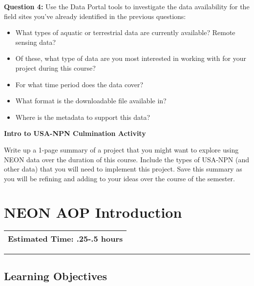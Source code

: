 \documentclass[]{book}
\providecommand{\tightlist}{%
  \setlength{\itemsep}{0pt}\setlength{\parskip}{0pt}}
\begin{document}
\leavevmode\hypertarget{ds-challenge}{}%
\textbf{Question 4:}
Use the Data Portal tools to investigate the data availability for the field
sites you've already identified in the previous questions:

\begin{itemize}
\tightlist
\item
  What types of aquatic or terrestrial data are currently available? Remote sensing data?\\
\item
  Of these, what type of data are you most interested in working with for your project during this course?\\
\item
  For what time period does the data cover?\\
\item
  What format is the downloadable file available in?\\
\item
  Where is the metadata to support this data?\\
\end{itemize}

\textbf{Intro to USA-NPN Culmination Activity}

Write up a 1-page summary of a project that you might want to explore using NEON data over the duration of this course. Include the types of USA-NPN (and other data) that you will need to implement this project. Save this summary as you will be refining and adding to your ideas over the course of the semester.

\hypertarget{neon-aop-introduction}{%
\chapter{NEON AOP Introduction}\label{neon-aop-introduction}}

\begin{longtable}[]{@{}l@{}}
\toprule
\endhead
Estimated Time: .25-.5 hours\tabularnewline
\bottomrule
\end{longtable}

\hypertarget{ds-objectives}{}
\begin{center}\rule{0.5\linewidth}{0.5pt}\end{center}

\hypertarget{learning-objectives}{%
\section{Learning Objectives}\label{learning-objectives}}
\end{document}
